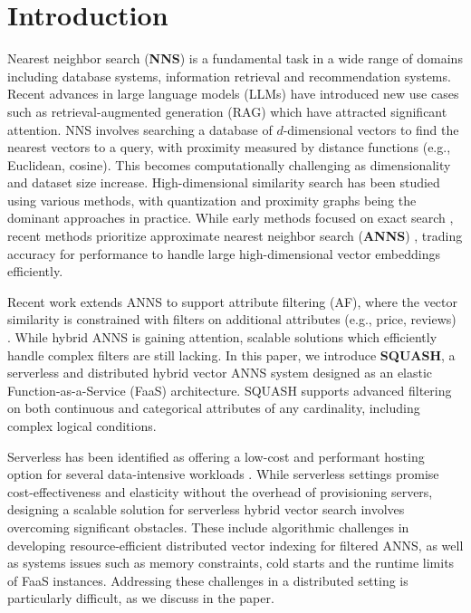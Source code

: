\section{Introduction}
\label{s:1-intro}

Nearest neighbor search (\textbf{NNS}) is a fundamental task in a wide range of domains including database systems, information retrieval and recommendation systems.
Recent advances in large language models (LLMs) have introduced new use cases such as retrieval-augmented generation (RAG) which have attracted significant attention. 
NNS involves searching a database of $d$-dimensional vectors to find the nearest vectors to a query, with proximity measured by distance functions (e.g., Euclidean, cosine). 
This becomes computationally challenging as dimensionality and dataset size increase. 
High-dimensional similarity search has been studied using various methods, with quantization and proximity graphs being the dominant approaches in practice. 
While early methods focused on exact search \cite{Weber1998VA, Ferhatosmanoglu2000VAPlus}, 
recent methods prioritize approximate nearest neighbor search (\textbf{ANNS}) \cite{Niu2023ResidualVectorProductQuantization, Gao2024RabitQ, Malkov2020HNSW, Jaiswal2022OODDiskANN, Xu2020, Zhao2022, Gao2023DCOs}, %
trading accuracy for performance to handle large high-dimensional vector embeddings efficiently.

Recent work extends ANNS to support attribute filtering (AF), where the vector similarity is constrained with filters on additional attributes (e.g., price, reviews) \cite{Gupta2023CAPS, Patel2024ACORN}. 
While hybrid ANNS is gaining attention, scalable solutions which efficiently handle complex filters are still lacking.  
In this paper, we introduce \textbf{SQUASH}, a serverless and distributed hybrid vector ANNS system designed as an elastic Function-as-a-Service (FaaS) architecture. SQUASH supports advanced filtering on both continuous and categorical attributes of any cardinality, including complex logical conditions. 

Serverless has been identified as offering a low-cost and performant hosting option for several data-intensive workloads \cite{Muller2020Lambada, Wang2024Starling, Oakley2024FSDInference, Su2024Vexless, Jarachanthan2021AMPS, Oakley2024ForesightPlus, Gillis2021}.
While serverless settings promise cost-effectiveness and elasticity without the overhead of provisioning servers, designing a scalable solution for serverless hybrid vector search involves overcoming significant obstacles. 
These include algorithmic challenges in developing resource-efficient distributed vector indexing for filtered ANNS, as well as systems issues such as memory constraints, cold starts and the runtime limits of FaaS instances. 
Addressing these challenges in a distributed setting is particularly difficult, as we discuss in the paper.

